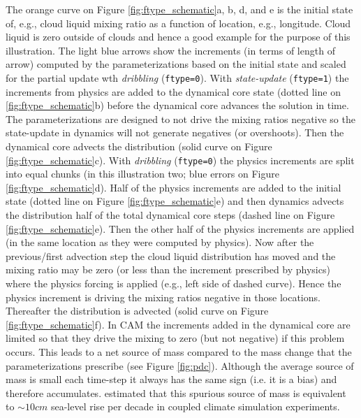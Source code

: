 \documentclass{agujournal}
\begin{document}
The orange curve on Figure \ref{fig:ftype_schematic}a, b, d, and e is the initial state of, e.g., cloud liquid mixing ratio as a function of location, e.g., longitude. Cloud liquid is zero outside of clouds and hence a good example for the purpose of this illustration. The light blue arrows show the increments (in terms of length of arrow) computed by the parameterizations based on the initial state and scaled for the partial update wth {\em{dribbling}} ({\tt{ftype=0}}). With {\em{state-update}} ({\tt{ftype=1}}) the increments from physics are added to the dynamical core state (dotted line on \ref{fig:ftype_schematic}b) before the dynamical core advances the solution in time. The parameterizations are designed to not drive the mixing ratios negative so the state-update in dynamics will not generate negatives (or overshoots). Then the dynamical core advects the distribution (solid curve on Figure \ref{fig:ftype_schematic}c). With {\em{dribbling}} ({\tt{ftype=0}}) the physics increments are split into equal chunks (in this illustration two; blue errors on Figure \ref{fig:ftype_schematic}d). Half of the physics increments are added to the initial state (dotted line on Figure \ref{fig:ftype_schematic}e) and then dynamics advects the distribution half of the total dynamical core steps (dashed line on Figure \ref{fig:ftype_schematic}e). Then the other half of the physics increments are applied (in the same location as they were computed by physics). Now after the previous/first advection step the cloud liquid distribution has moved and the mixing ratio may be zero (or less than the increment prescribed by physics) where the physics forcing is applied (e.g., left side of dashed curve). Hence the physics increment is driving the mixing ratios negative in those locations. Thereafter the distribution is advected (solid curve on Figure \ref{fig:ftype_schematic}f). In CAM the increments added in the dynamical core are limited so that they drive the mixing to zero (but not negative) if this problem occurs. This leads to a net source of mass compared to the mass change that the parameterizations prescribe (see Figure \ref{fig:pdc}). Although the average source of mass is small each time-step it always has the same sign (i.e. it is a bias) and therefore accumulates. \citet{water-leak} estimated that this spurious source of mass is equivalent to $\sim 10cm$ sea-level rise per decade in coupled climate simulation experiments.
\end{document}
